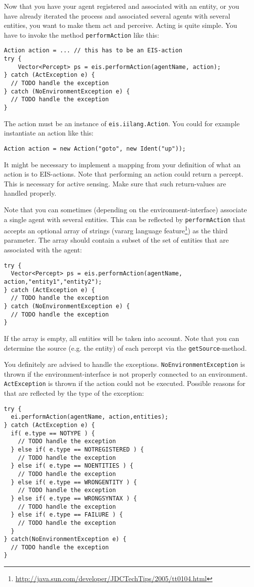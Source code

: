 \documentclass[a4]{article}
\newcommand{\EIS}{\textsf{EIS}\xspace}
\begin{document}
Now that you have your agent registered and associated with an entity, or you have already iterated the process and associated
several agents with several entities, you want to make them act and perceive. Acting is quite simple. You have to invoke
the method \texttt{performAction} like this:
\begin{verbatim}
Action action = ... // this has to be an EIS-action
try {
    Vector<Percept> ps = eis.performAction(agentName, action);
} catch (ActException e) {
  // TODO handle the exception
} catch (NoEnvironmentException e) {
  // TODO handle the exception
}
\end{verbatim}
The action must be an instance of \texttt{eis.iilang.Action}. You could for example instantiate an action like this:
\begin{verbatim}
Action action = new Action("goto", new Ident("up"));
\end{verbatim}
It might be necessary to implement a mapping from your definition of what an action is to \EIS-actions.
Note that performing an action could return a percept. This is necessary for active sensing. 
Make sure that such return-values are handled properly.

Note that you can sometimes (depending on the environment-interface) associate a single agent with several entities.
This can be reflected by \texttt{performAction} that accepts an optional array of strings 
(vararg language feature\footnote{\url{http://java.sun.com/developer/JDCTechTips/2005/tt0104.html}}) as the third parameter. 
The array should contain a subset of the set of entities that are associated with the agent: 
\begin{verbatim}
try {
  Vector<Percept> ps = eis.performAction(agentName, action,"entity1","entity2");
} catch (ActException e) {
  // TODO handle the exception
} catch (NoEnvironmentException e) {
  // TODO handle the exception
}
\end{verbatim}
If the array is empty, all
entities will be taken into account. Note that you can determine the source (e.g. the entity) of each percept via the
\texttt{getSource}-method.

You definitely are advised to handle the exceptions. \texttt{NoEnvironmentException} is thrown if the environment-interface
is not properly connected to an environment. \texttt{ActException} is thrown if the action could not be executed. Possible
reasons for that are reflected by the type of the exception:
\begin{verbatim}
try {
  ei.performAction(agentName, action,entities);
} catch (ActException e) {
  if( e.type == NOTYPE ) {
    // TODO handle the exception
  } else if( e.type == NOTREGISTERED ) {
    // TODO handle the exception
  } else if( e.type == NOENTITIES ) {
    // TODO handle the exception
  } else if( e.type == WRONGENTITY ) {
    // TODO handle the exception
  } else if( e.type == WRONGSYNTAX ) {
    // TODO handle the exception
  } else if( e.type == FAILURE ) {
    // TODO handle the exception
  }
} catch(NoEnvironmentException e) {
  // TODO handle the exception
}
\end{verbatim}
\end{document}
